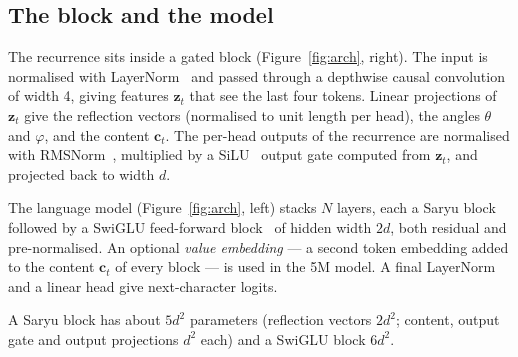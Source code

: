 \documentclass[10pt]{article}
\newcommand{\bc}{\mathbf{c}}
\newcommand{\bz}{\mathbf{z}}
\begin{document}
\subsection{The block and the model}

The recurrence sits inside a gated block (Figure~\ref{fig:arch}, right). The input is normalised with
LayerNorm~\cite{ba2016} and passed through a depthwise causal convolution of width 4, giving features
$\bz_t$ that see the last four tokens. Linear projections of $\bz_t$ give the reflection vectors
(normalised to unit length per head), the angles $\theta$ and $\varphi$, and the content $\bc_t$. The
per-head outputs of the recurrence are normalised with RMSNorm~\cite{zhang2019rms}, multiplied by a
SiLU~\cite{elfwing2018} output gate computed from $\bz_t$, and projected back to width $d$.

The language model (Figure~\ref{fig:arch}, left) stacks $N$ layers, each a Saryu block followed by a
SwiGLU feed-forward block~\cite{shazeer2020} of hidden width $2d$, both residual and pre-normalised. An
optional \emph{value embedding} --- a second token embedding added to the content $\bc_t$ of every
block --- is used in the 5M model. A final LayerNorm and a linear head give next-character logits.

A Saryu block has about $5d^2$ parameters (reflection vectors $2d^2$; content, output gate and output
projections $d^2$ each) and a SwiGLU block $6d^2$.
\end{document}
